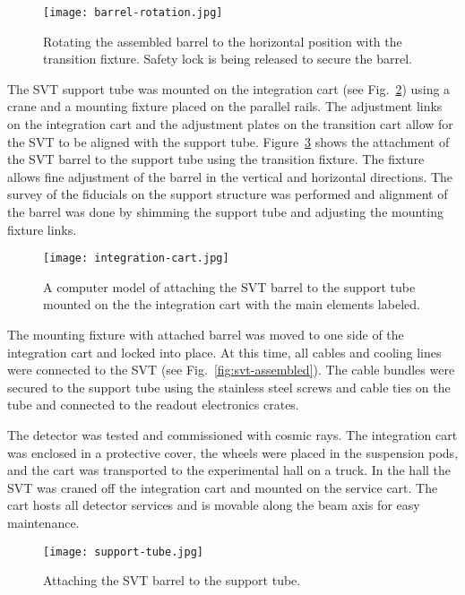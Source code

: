 \begin{figure}[h] 
\centering 
\texttt{[image: barrel-rotation.jpg]}
\caption{Rotating the assembled barrel to the horizontal position with the transition fixture. Safety lock is being released to secure the barrel.}
\label{fig:barrel-rotation}
\end{figure}

The SVT support tube was mounted on the integration cart (see Fig.~\ref{fig:integration-cart}) using a crane and a mounting fixture placed on the parallel rails. The adjustment links on the integration cart and the adjustment plates on the transition cart allow for the SVT to be aligned with the support tube. Figure~\ref{fig:support-tube} shows the attachment of the SVT barrel to the support tube using the transition fixture. The fixture allows fine adjustment of the barrel in the vertical and horizontal directions. The survey of the fiducials on the support structure was performed and alignment of the barrel was done by shimming the support tube and adjusting the mounting fixture links. 

\begin{figure}[h] 
\centering 
\texttt{[image: integration-cart.jpg]}
\caption{A computer model of attaching the SVT barrel to the support tube mounted on the the integration cart with the main elements labeled.}
\label{fig:integration-cart}
\end{figure}

The mounting fixture with attached barrel was moved to one side of the integration cart and locked into place. At this time, all cables and cooling lines were connected to the SVT (see Fig.~\ref{fig:svt-assembled}). The cable bundles were secured to the support tube using the stainless steel screws and cable ties on the tube and connected to the readout electronics crates. 

The detector was tested and commissioned with cosmic rays. The integration cart was enclosed in a protective cover, the wheels were placed in the suspension pods, and the cart was transported to the experimental hall on a truck. In the hall the SVT was craned off the integration cart and mounted on the service cart. The cart hosts all detector services and is movable along the beam axis for easy maintenance.

\begin{figure}[h] 
\centering 
\texttt{[image: support-tube.jpg]}
\caption{Attaching the SVT barrel to the support tube.}
\label{fig:support-tube}
\end{figure}

